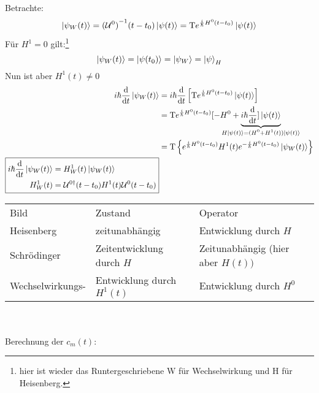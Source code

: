 	Betrachte:
		\begin{equation*}
			\ket{\psi_W(t)} = {(\mathcal{U}^0)}^{-1} (t-t_0) \ket{\psi(t)} 
			= \mathrm{T} e^{\frac{i}{\hbar} H^0 (t-t_0)} \ket{\psi(t)} 
		\end{equation*}
	Für $H^1=0$ gilt:\footnote{hier ist wieder das Runtergeschriebene W für Wechselwirkung und H für Heisenberg.}
		\begin{equation*}
			\ket{\psi_W(t)} = \ket{\psi(t_0)} = \ket{\psi_W} = \ket{\psi}_H
		\end{equation*}
	Nun ist aber $H^1(t) \neq 0$
		\begin{align}
			i\hbar \frac{\diff}{\diff t} \ket{\psi_W(t)} &=
			i\hbar \frac{\diff}{\diff t} \left[\T e^{\frac{i}{\hbar} H^0(t-t_0)} \ket{\psi(t)}\right] \nonumber \\ \nonumber
			&= \T e^{\frac{i}{\hbar} H^0(t-t_0)} [ -H^0 + 
			\underbrace{i\hbar \frac{\diff}{\diff t}] \ket{\psi(t)}}_{
				\mathclap{H \ket{\psi(t)} = (H^0 + H^1(t)) \ket{\psi(t)}}
				} \\ \nonumber
			&= \T \left\{ e^{\frac{i}{\hbar} H^0(t-t_0)} H^1(t) e^{-\frac{i}{\hbar} H^0(t-t_0)} \ket{\psi_W(t)}\right\}  \\ 
			\boxed{
		\begin{aligned}i\hbar \frac{\diff}{\diff t} \ket{\psi_W(t)} 
				&= H^1_W(t) \ket{\psi_W(t)}  \\ 
				H^1_W(t)& = \U^{0\dagger} (t-t_0) H^1(t) \U^0(t-t_0) 
		\end{aligned}
			} \label{Wechselwirkung}
		\end{align}
		\begin{tabular*}{\linewidth}{l l l}
			Bild & Zustand & Operator \\
			Heisenberg & zeitunabhängig & Entwicklung durch $H$ \\
			Schrödinger & Zeitentwicklung durch $H$ & Zeitunabhängig (hier aber $H(t))$ \\
			Wechselwirkungs- & Entwicklung durch $H^1(t)$ & Entwicklung durch $H^0$
		\end{tabular*} %
		 \\ \\
	Berechnung der $c_m(t)$:
	
